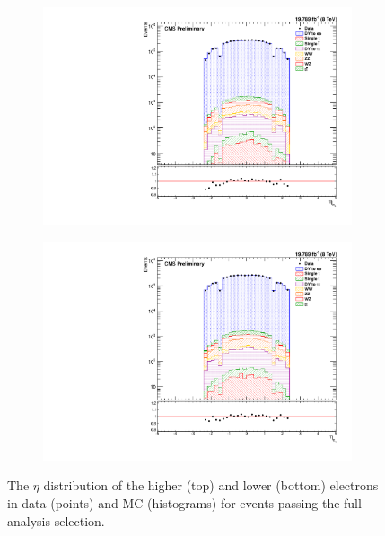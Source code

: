 \begin{figure}[tb]
    \vspace*{\fill}
    \centering
    \begin{subfigure}[b]{0.65\textwidth}
        \includegraphics[width=\textwidth]{figures/e0_eta.pdf}
        \caption{}
        \label{fig:e_eta_high}
    \end{subfigure}
    \begin{subfigure}[b]{0.65\textwidth}
        \includegraphics[width=\textwidth]{figures/e1_eta.pdf}
        \caption{}
        \label{fig:e_eta_low}
    \end{subfigure}
    \caption{
        The $\eta$ distribution of the higher (top) and lower (bottom) \pt
        electrons in data (points) and MC (histograms) for events passing the
        full analysis selection.
    }
    \label{fig:e_eta}
\end{figure}

